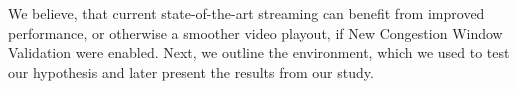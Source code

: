 \documentclass[10pt,sigconf]{acmart}
\begin{document}
We believe, that current state-of-the-art streaming can benefit from improved performance, or otherwise a smoother video playout, if New Congestion Window Validation were enabled. Next, we outline the environment, which we used to test our hypothesis and later present the results from our study.





\end{document}
